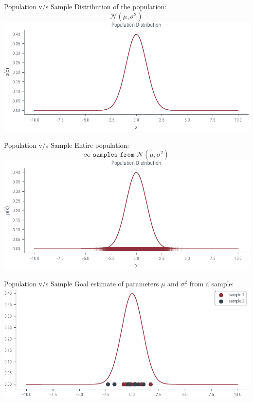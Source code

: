 \documentclass[handout]{beamer}
\begin{document}
    \begin{frame}{Population v/s Sample}
        Distribution of the population:
        $$\mathcal{N}(\mu, \sigma^2)$$
        \includegraphics[width=\textwidth]{../figures/mle/population-dist.pdf}
        
    \end{frame}

    \begin{frame}{Population v/s Sample}
        Entire population:
        $$\infty \texttt{ samples from } \mathcal{N}(\mu, \sigma^2)$$
        \includegraphics[width=\textwidth]{../figures/mle/population.pdf}
        
    \end{frame}

    \begin{frame}{Population v/s Sample}
        Goal estimate of parameters $\mu$ and $\sigma^2$ from a sample:
        \includegraphics[width=\textwidth]{../figures/mle/sample.pdf}
        
    \end{frame}
    
\end{document}
